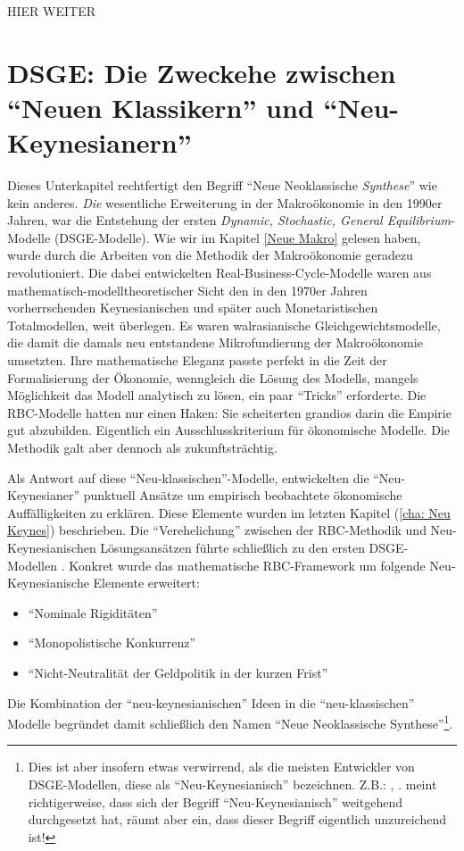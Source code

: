 HIER WEITER



\section{DSGE: Die Zweckehe zwischen "`Neuen Klassikern"' und "`Neu-Keynesianern"'}

Dieses Unterkapitel rechtfertigt den Begriff "`Neue Neoklassische \textit{Synthese}"' wie kein anderes. \textit{Die} wesentliche Erweiterung in der Makroökonomie in den 1990er Jahren, war die Entstehung der ersten \textit{Dynamic, Stochastic, General Equilibrium}-Modelle (DSGE-Modelle). Wie wir im Kapitel \ref{Neue Makro} gelesen haben, wurde durch die Arbeiten von \textcite{Kydland1982, Plosser1983} die Methodik der Makroökonomie geradezu revolutioniert. Die dabei entwickelten Real-Business-Cycle-Modelle waren aus mathematisch-modelltheoretischer Sicht den in den 1970er Jahren vorherrschenden Keynesianischen und später auch Monetaristischen Totalmodellen, weit überlegen. Es waren walrasianische Gleichgewichtsmodelle, die damit die damals neu entstandene Mikrofundierung der Makroökonomie umsetzten. Ihre mathematische Eleganz passte perfekt in die Zeit der Formalisierung der Ökonomie, wenngleich die Lösung des Modells, mangels Möglichkeit das Modell analytisch zu lösen, ein paar "`Tricks"' erforderte. Die RBC-Modelle hatten nur einen Haken: Sie scheiterten grandios darin die Empirie gut abzubilden. Eigentlich ein Ausschlusskriterium für ökonomische Modelle. Die Methodik galt aber dennoch als zukunftsträchtig. 

Als Antwort auf diese "`Neu-klassischen"'-Modelle, entwickelten die "`Neu-Keynesianer"' punktuell Ansätze um empirisch beobachtete ökonomische Auffälligkeiten zu erklären. Diese Elemente wurden im letzten Kapitel (\ref{cha: Neu Keynes}) beschrieben. Die "`Verehelichung"' zwischen der RBC-Methodik und Neu-Keynesianischen Lösungsansätzen führte schließlich zu den ersten DSGE-Modellen \parencite[S. 5]{Gali2015}. Konkret wurde das mathematische RBC-Framework um folgende Neu-Keynesianische Elemente erweitert:
\begin{itemize}
	\item "`Nominale Rigiditäten"'
	\item "`Monopolistische Konkurrenz"'
	\item "`Nicht-Neutralität der Geldpolitik in der kurzen Frist"'   
\end{itemize}

Die Kombination der "`neu-keynesianischen"' Ideen in die "`neu-klassischen"' Modelle begründet damit schließlich den Namen "`Neue Neoklassische Synthese"'\footnote{Dies ist aber insofern etwas verwirrend, als die meisten Entwickler von DSGE-Modellen, diese als "`Neu-Keynesianisch"' bezeichnen. Z.B.: \textcite{Gali2015}, \textcite{Romer2019}. \textcite[S. 28]{Gali2007} meint richtigerweise, dass sich der Begriff "`Neu-Keynesianisch"' weitgehend durchgesetzt hat, räumt aber ein, dass dieser Begriff eigentlich unzureichend ist!}.

